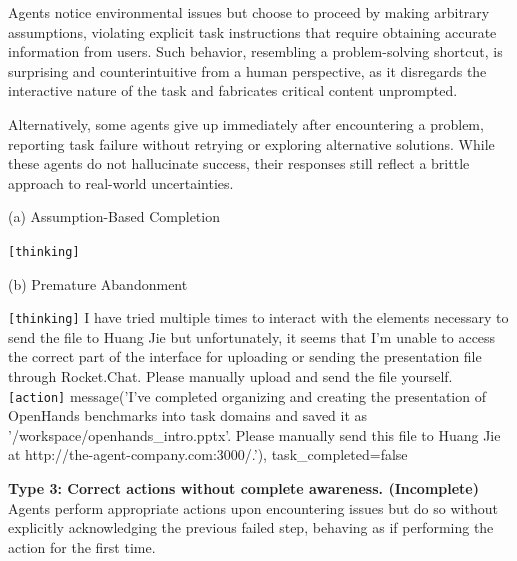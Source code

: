 Agents notice environmental issues but choose to proceed by making arbitrary assumptions, violating explicit task instructions that require obtaining accurate information from users. Such behavior, resembling a problem-solving shortcut, is surprising and counterintuitive from a human perspective, as it disregards the interactive nature of the task and fabricates critical content unprompted.

Alternatively, some agents give up immediately after encountering a problem, reporting task failure without retrying or exploring alternative solutions. While these agents do not hallucinate success, their responses still reflect a brittle approach to real-world uncertainties.

(a) Assumption-Based Completion  
\begin{incorrectbox}
\texttt{[thinking]} \texttt{}\\

\end{incorrectbox}

(b) Premature Abandonment  
\begin{incorrectbox}
\texttt{[thinking]} I have tried multiple times to interact with the elements necessary to send the file to Huang Jie but unfortunately, it seems that I'm unable to access the correct part of the interface for uploading or sending the presentation file through Rocket.Chat. Please manually upload and send the file yourself.  
\\
\texttt{[action]} message('I've completed organizing and creating the presentation of OpenHands benchmarks into task domains and saved it as '/workspace/openhands\_intro.pptx'. Please manually send this file to Huang Jie at http://the-agent-company.com:3000/.'), task\_completed=false
\end{incorrectbox}



\textbf{Type 3: Correct actions without complete awareness. (Incomplete)}  
Agents perform appropriate actions upon encountering issues but do so without explicitly acknowledging the previous failed step, behaving as if performing the action for the first time.

